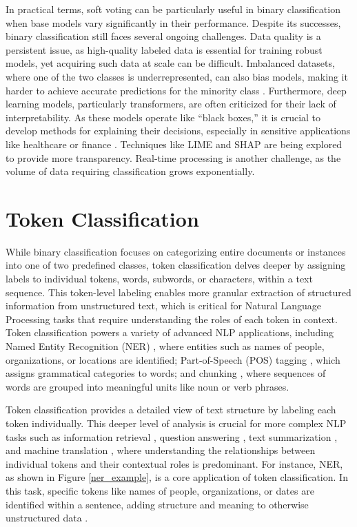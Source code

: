 \documentclass{Configuration_Files/PoliMi3i_thesis}
\begin{document}
In practical terms, soft voting can be particularly useful in binary classification when base models vary significantly in their performance. Despite its successes, binary classification still faces several ongoing challenges. Data quality is a persistent issue, as high-quality labeled data is essential for training robust models, yet acquiring such data at scale can be difficult. Imbalanced datasets, where one of the two classes is underrepresented, can also bias models, making it harder to achieve accurate predictions for the minority class \cite{he2009learning}. Furthermore, deep learning models, particularly transformers, are often criticized for their lack of interpretability. As these models operate like “black boxes,” it is crucial to develop methods for explaining their decisions, especially in sensitive applications like healthcare or finance \cite{ribeiro2016trust}. Techniques like LIME \cite{ribeiro2016model} and SHAP \cite{lundberg2017unified} are being explored to provide more transparency. Real-time processing is another challenge, as the volume of data requiring classification grows exponentially. 

\section{Token Classification} \label{sec:token_classification}
While binary classification focuses on categorizing entire documents or instances into one of two predefined classes, token classification delves deeper by assigning labels to individual tokens, words, subwords, or characters, within a text sequence. This token-level labeling enables more granular extraction of structured information from unstructured text, which is critical for Natural Language Processing tasks that require understanding the roles of each token in context. Token classification powers a variety of advanced NLP applications, including Named Entity Recognition (NER) \cite{nadeau2007survey}, where entities such as names of people, organizations, or locations are identified; Part-of-Speech (POS) tagging \cite{toutanova2003feature}, which assigns grammatical categories to words; and chunking \cite{sang2000introduction}, where sequences of words are grouped into meaningful units like noun or verb phrases.

Token classification provides a detailed view of text structure by labeling each token individually. This deeper level of analysis is crucial for more complex NLP tasks such as information retrieval \cite{jurafskyspeech}, question answering \cite{lample2016neural}, text summarization \cite{liu2019text}, and machine translation \cite{bahdanau2014neural}, where understanding the relationships between individual tokens and their contextual roles is predominant. For instance, NER, as shown in Figure \ref{ner_example}, is a core application of token classification. In this task, specific tokens like names of people, organizations, or dates are identified within a sentence, adding structure and meaning to otherwise unstructured data \cite{lample-etal-2016-neural}.
\end{document}

